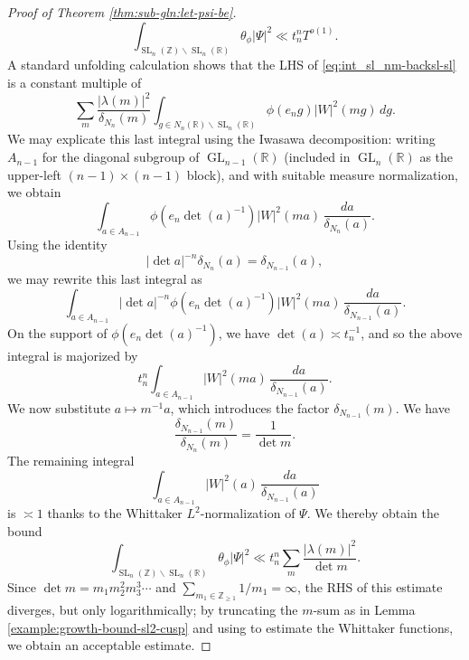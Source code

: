 \documentclass[reqno]{amsart}
\DeclareMathOperator{\SL}{SL}
\DeclareMathOperator{\GL}{GL}
\theoremstyle{plain} \newtheorem{theorem} {Theorem}
\theoremstyle{definition} \newtheorem{definition} [theorem] {Definition}
\theoremstyle{itplain} %
\numberwithin{equation}{section}
\numberwithin{theorem}{section}
\renewcommand{\geq}{\geqslant}
\begin{document}
\begin{proof}[Proof of Theorem \ref{thm:sub-gln:let-psi-be}]
\begin{equation}\label{eq:int_sl_nm-backsl-sl}
  \int_{\SL_n(\mathbb{Z}) \backslash \SL_n(\mathbb{R})} \theta_\phi |\Psi|^2 \ll t_n^n T^{o(1)}.
\end{equation}
A standard unfolding calculation shows that the LHS of \eqref{eq:int_sl_nm-backsl-sl} is a constant multiple of
\begin{equation}\label{eq:sum-_m-fracl}
    \sum _{m}
    \frac{|\lambda(m)|^2}{\delta_{N_n}(m)}
    \int _{g \in N_n(\mathbb{R}) \backslash \SL_n(\mathbb{R})} \phi(e_n g)
    |W|^2(m  g) \, d g.
  \end{equation}
  We may explicate this last integral using the Iwasawa decomposition: writing $A_{n-1}$ for the diagonal subgroup of $\GL_{n-1}(\mathbb{R})$ (included in $\GL_{n}(\mathbb{R})$ as the upper-left $(n-1) \times (n-1)$ block), and with suitable measure normalization, we obtain
\begin{equation*}
  \int _{a \in A_{n-1}}
  \phi(e_n \det(a)^{-1})
  |W|^2(m a) \, \frac{d a }{ \delta_{N_n}(a)}.
\end{equation*}
Using the identity
\begin{equation*}
|\det a|^{-n} \delta_{N_n}(a) = \delta_{N_{n-1}}(a),
\end{equation*}
we may rewrite this last integral as
\begin{equation*}
  \int _{a \in A_{n-1}}
  |\det a|^{-n}
  \phi(e_n \det(a)^{-1})
  |W|^2(m a) \, \frac{d a }{ \delta_{N_{n-1}}(a)}.
\end{equation*}
On the support of $\phi (e_n \det(a)^{-1})$, we have $\det(a) \asymp t_n^{-1}$, and so the above integral is majorized by
\begin{equation*}
  t_n^{n} \int _{a \in A_{n-1}} |W|^2(m a) \, \frac{d a }{ \delta_{N_{n-1}}(a) }.
\end{equation*}
We now substitute $a \mapsto m^{-1} a$, which introduces the factor $\delta_{N_{n-1}}(m)$.  We have
\begin{equation*}
  \frac{\delta_{N_{n-1}}(m)}{\delta_{N_n}(m)}
  = \frac{1}{\det m}.
\end{equation*}
The remaining integral
\begin{equation*}
  \int _{a \in A_{n-1}} |W|^2(a) \, \frac{d a}{\delta_{N_{n-1}}(a)}
\end{equation*}
is $\asymp 1$ thanks to the Whittaker $L^2$-normalization of $\Psi$.  We thereby obtain the bound
\begin{equation*}
  \int  _{\SL_n(\mathbb{Z}) \backslash \SL_n(\mathbb{R})}
  \theta_\phi |\Psi|^2
  \ll
  t_n^{n}
  \sum _{m}
  \frac{|\lambda(m)|^2}{ \det m }.
\end{equation*}
Since $\det m = m_1 m_2^2 m_3^3 \dotsb$ and $\sum_{m_1 \in \mathbb{Z}_{\geq 1}} 1/m_1 = \infty$, the RHS of this estimate diverges, but only logarithmically; by truncating the $m$-sum as in Lemma \ref{example:growth-bound-sl2-cusp} and using \cite[Thm 2]{MR4093914} to estimate the Whittaker functions, we obtain an acceptable estimate.
\end{proof}
\end{document}
